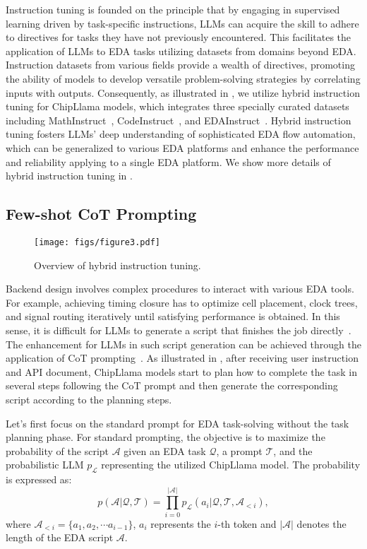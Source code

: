Instruction tuning is founded on the principle that by engaging in supervised learning driven by task-specific instructions, LLMs can acquire the skill to adhere to directives for tasks they have not previously encountered. 
This facilitates the application of LLMs to EDA tasks utilizing datasets from domains beyond EDA. 
Instruction datasets from various fields provide a wealth of directives, promoting the ability of models to develop versatile problem-solving strategies by correlating inputs with outputs.
Consequently, as illustrated in , we utilize hybrid instruction tuning for ChipLlama models, which integrates three specially curated datasets including MathInstruct~\cite{yu2023metamath}, CodeInstruct~\cite{wei2023magicoder}, and EDAInstruct~\cite{wu2024chateda}.  
Hybrid instruction tuning fosters LLMs' deep understanding of sophisticated EDA flow automation, which can be generalized to various EDA platforms and enhance the performance and reliability applying to a single EDA platform.
We show more details of hybrid instruction tuning in .

\subsection{Few-shot CoT Prompting}
\label{sec:ChipAgent-CoT}

\begin{figure}[tb!]
    \centering
    \texttt{[image: figs/figure3.pdf]} 
    \caption{Overview of hybrid instruction tuning.}
    \label{fig:hit}
\end{figure}

Backend design involves complex procedures to interact with various EDA tools.
For example, achieving timing closure has to optimize cell placement, clock trees, and signal routing iteratively until satisfying performance is obtained.
In this sense, it is difficult for LLMs to generate a script that finishes the job directly~\cite{wu2024chateda}.
The enhancement for LLMs in such script generation can be achieved through the application of CoT prompting~\cite{wei2022cot}.
As illustrated in , after receiving user instruction and API document, ChipLlama models start to plan how to complete the task in several steps following the CoT prompt and then generate the corresponding script according to the planning steps. 

Let's first focus on the standard prompt for EDA task-solving without the task planning phase. 
For standard prompting, the objective is to maximize the probability of the script $\mathcal{A}$ given an EDA task $\mathcal{Q}$, a prompt $\mathcal{T}$, and the probabilistic LLM $p_{\mathcal{L}}$ representing the utilized ChipLlama model. The probability is expressed as:
\begin{equation}
    p(\mathcal{A}|\mathcal{Q},\mathcal{T}) = \prod \limits_{i=0}^{|\mathcal{A}|} p_{\mathcal{L}}(a_{i}|\mathcal{Q},\mathcal{T},\mathcal{A}_{<i}),
    \label{Eq:standard_prompt}
\end{equation}
where $\mathcal{A}_{<i} = \{a_1, a_2, \cdots a_{i-1}\}$, $a_{i}$ represents the $i$-th token and $|\mathcal{A}|$ denotes the length of the EDA script $\mathcal{A}$. 

